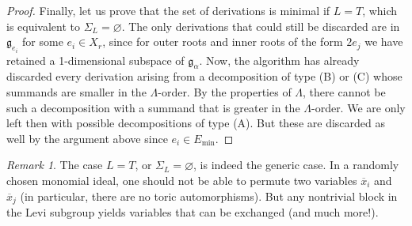 \documentclass[11pt,letterpaper,reqno]{amsart}
\theoremstyle{remark}
\newtheorem{remark}[remark]{Remark}
\theoremstyle{definition}
\begin{document}
\begin{proof}
Finally, let us prove that the set of derivations is minimal if $L=T$, which is equivalent to $\Sigma_L=\varnothing$. The only derivations that could still be discarded are in $\mathfrak g_{e_i}$ for some $e_i\in X_r$, since for outer roots and inner roots of the form $2e_j$ we have retained a 1-dimensional subspace of $\mathfrak g_\alpha$. Now, the algorithm has already discarded every derivation arising from a decomposition of type \textup{(B)} or \textup{(C)} whose summands are smaller in the $\Lambda$-order. By the properties of $\Lambda$, there cannot be such a decomposition with a summand that is greater in the $\Lambda$-order. We are only left then with possible decompositions of type \textup{(A)}. But these are discarded as well by the argument above since $e_i\in E_\mathrm{min}$.
\end{proof}

\begin{remark}
The case $L=T$, or $\Sigma_L=\varnothing$, is indeed the generic case. In a randomly chosen monomial ideal, one should not be able to permute two variables $\overline x_i$ and $\overline x_j$ (in particular, there are no toric automorphisms). But any nontrivial block in the Levi subgroup yields variables that can be exchanged (and much more!).
\end{remark}
\end{document}
